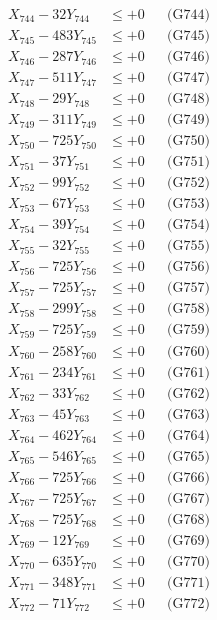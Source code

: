 \documentclass[a4paper,10pt]{article}
\begin{document}
{\begin{align}
X_{744} - 32Y_{744} &\leq +0 && \text{(G744)} \\
X_{745} - 483Y_{745} &\leq +0 && \text{(G745)} \\
X_{746} - 287Y_{746} &\leq +0 && \text{(G746)} \\
X_{747} - 511Y_{747} &\leq +0 && \text{(G747)} \\
X_{748} - 29Y_{748} &\leq +0 && \text{(G748)} \\
X_{749} - 311Y_{749} &\leq +0 && \text{(G749)} \\
X_{750} - 725Y_{750} &\leq +0 && \text{(G750)} \\
\allowbreak
X_{751} - 37Y_{751} &\leq +0 && \text{(G751)} \\
X_{752} - 99Y_{752} &\leq +0 && \text{(G752)} \\
X_{753} - 67Y_{753} &\leq +0 && \text{(G753)} \\
X_{754} - 39Y_{754} &\leq +0 && \text{(G754)} \\
X_{755} - 32Y_{755} &\leq +0 && \text{(G755)} \\
X_{756} - 725Y_{756} &\leq +0 && \text{(G756)} \\
X_{757} - 725Y_{757} &\leq +0 && \text{(G757)} \\
X_{758} - 299Y_{758} &\leq +0 && \text{(G758)} \\
X_{759} - 725Y_{759} &\leq +0 && \text{(G759)} \\
X_{760} - 258Y_{760} &\leq +0 && \text{(G760)} \\
\allowbreak
X_{761} - 234Y_{761} &\leq +0 && \text{(G761)} \\
X_{762} - 33Y_{762} &\leq +0 && \text{(G762)} \\
X_{763} - 45Y_{763} &\leq +0 && \text{(G763)} \\
X_{764} - 462Y_{764} &\leq +0 && \text{(G764)} \\
X_{765} - 546Y_{765} &\leq +0 && \text{(G765)} \\
X_{766} - 725Y_{766} &\leq +0 && \text{(G766)} \\
X_{767} - 725Y_{767} &\leq +0 && \text{(G767)} \\
X_{768} - 725Y_{768} &\leq +0 && \text{(G768)} \\
X_{769} - 12Y_{769} &\leq +0 && \text{(G769)} \\
X_{770} - 635Y_{770} &\leq +0 && \text{(G770)} \\
\allowbreak
X_{771} - 348Y_{771} &\leq +0 && \text{(G771)} \\
X_{772} - 71Y_{772} &\leq +0 && \text{(G772)} \\

\end{align}}
\end{document}
